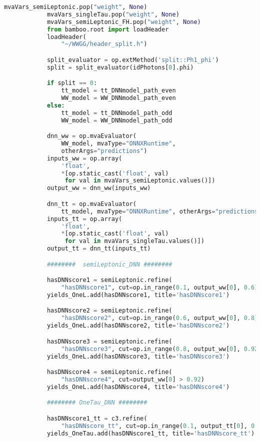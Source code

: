 \begin{lstlisting}[language=Python, caption=Python module of the analysis used in Bamboo framework, label={bamboocode}]
            mvaVars_semiLeptonic.pop("weight", None)
            mvaVars_singleTau.pop("weight", None)
            mvaVars_semiLeptonic_FH.pop("weight", None)
            from bamboo.root import loadHeader
            loadHeader(
                "~/WWGG/header_split.h")

            split_evaluator = op.extMethod('split::Ph1_phi')
            split = split_evaluator(idPhotons[0].phi)

            if split == 0:
                tt_model = tt_DNNmodel_path_even
                WW_model = WW_DNNmodel_path_even
            else:
                tt_model = tt_DNNmodel_path_odd
                WW_model = WW_DNNmodel_path_odd

            dnn_ww = op.mvaEvaluator(
                WW_model, mvaType="ONNXRuntime",
                otherArgs="predictions")
            inputs_ww = op.array(
                'float',
                *[op.static_cast('float', val)
                 for val in mvaVars_semiLeptonic.values()])
            output_ww = dnn_ww(inputs_ww)

            dnn_tt = op.mvaEvaluator(
                tt_model, mvaType="ONNXRuntime", otherArgs="predictions")
            inputs_tt = op.array(
                'float',
                *[op.static_cast('float', val)
                 for val in mvaVars_singleTau.values()])
            output_tt = dnn_tt(inputs_tt)

            ########  semiLeptonic_DNN ########

            hasDNNscore1 = semiLeptonic.refine(
                "hasDNNscore1", cut=op.in_range(0.1, output_ww[0], 0.6))
            yields_OneL.add(hasDNNscore1, title='hasDNNscore1')

            hasDNNscore2 = semiLeptonic.refine(
                "hasDNNscore2", cut=op.in_range(0.6, output_ww[0], 0.8))
            yields_OneL.add(hasDNNscore2, title='hasDNNscore2')

            hasDNNscore3 = semiLeptonic.refine(
                "hasDNNscore3", cut=op.in_range(0.8, output_ww[0], 0.92))
            yields_OneL.add(hasDNNscore3, title='hasDNNscore3')

            hasDNNscore4 = semiLeptonic.refine(
                "hasDNNscore4", cut=output_ww[0] > 0.92)
            yields_OneL.add(hasDNNscore4, title='hasDNNscore4')

            ######## OneTau_DNN ########

            hasDNNscore1_tt = c3.refine(
                "hasDNNscore_tt", cut=op.in_range(0.1, output_tt[0], 0.65))
            yields_OneTau.add(hasDNNscore1_tt, title='hasDNNscore_tt')


\end{lstlisting}
